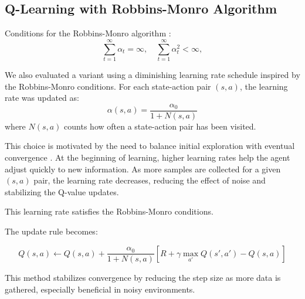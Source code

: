 \documentclass[10pt,twocolumn,letterpaper]{article}
\begin{document}
\subsection*{Q-Learning with Robbins-Monro Algorithm}

Conditions for the Robbins-Monro algorithm \cite{neuralq}:
\[
\sum_{t=1}^{\infty} \alpha_t = \infty, \quad \sum_{t=1}^{\infty} \alpha_t^2 < \infty,
\]

We also evaluated a variant using a diminishing learning rate schedule inspired by the Robbins-Monro conditions. For each state-action pair $(s,a)$, the learning rate was updated as:
\[
\alpha(s,a) = \frac{\alpha_0}{1 + N(s,a)}
\]
where $N(s,a)$ counts how often a state-action pair has been visited.

This choice is motivated by the need to balance initial exploration with eventual convergence \cite{lecture10}. At the beginning of learning, higher learning rates help the agent adjust quickly to new information. As more samples are collected for a given $(s,a)$ pair, the learning rate decreases, reducing the effect of noise and stabilizing the Q-value updates.

This learning rate satisfies the Robbins-Monro conditions.

The update rule becomes:
\begin{adjustwidth}{-2cm}{0cm}
    $$
    Q(s, a) \leftarrow Q(s, a) + \frac{\alpha_0}{1 + N(s,a)} \left[ R + \gamma \max_{a'} Q(s', a') - Q(s, a) \right]
    $$
\end{adjustwidth}


This method stabilizes convergence by reducing the step size as more data is gathered, especially beneficial in noisy environments.
\end{document}

